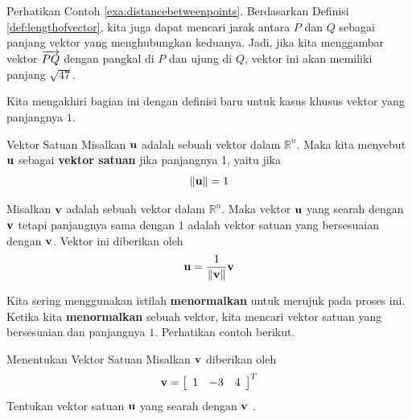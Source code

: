 Perhatikan Contoh \ref{exa:distancebetweenpoints}. Berdasarkan Definisi \ref{def:lengthofvector}, kita juga dapat mencari jarak antara $P$ dan $Q$
sebagai panjang vektor yang menghubungkan keduanya. Jadi, jika kita menggambar vektor $\overrightarrow{PQ}$
dengan pangkal di $P$ dan ujung di $Q$, vektor ini akan memiliki panjang
$\sqrt{47}$.

Kita mengakhiri bagian ini dengan definisi baru untuk kasus khusus
vektor yang panjangnya $1$.

\begin{definition}{Vektor Satuan}\label{def:unitvector}
Misalkan $\mathbf{u}$ adalah sebuah vektor dalam $\mathbb{R}^{n}$. Maka kita menyebut $\mathbf{u}$ sebagai
\textbf{vektor satuan}  jika panjangnya 1, yaitu jika
\begin{equation*}
\| \mathbf{u} \|
=
1
\end{equation*}
\end{definition}

Misalkan $\mathbf{v}$ adalah sebuah vektor dalam $\mathbb{R}^{n}$. Maka vektor $\mathbf{u}$
yang searah dengan $\mathbf{v}$ tetapi panjangnya sama dengan $1$ adalah vektor satuan yang bersesuaian dengan $\mathbf{v}$.
Vektor ini diberikan oleh
\begin{equation*}
\mathbf{u}
=
\frac{1}{\| \mathbf{v} \|}
\mathbf{v}
\end{equation*}

Kita sering menggunakan istilah \textbf{menormalkan} untuk merujuk pada proses ini. Ketika kita \textbf{menormalkan} sebuah vektor, kita mencari vektor satuan yang bersesuaian dan panjangnya $1$.
Perhatikan contoh berikut.

\begin{example}{Menentukan Vektor Satuan}\label{exa:unitvector}
Misalkan $\mathbf{v}$ diberikan oleh
\begin{equation*}
\mathbf{v}
=
\left[
\begin{array}{rrr}
1 & -3 & 4
\end{array}
\right]^T
\end{equation*}
Tentukan vektor satuan $\mathbf{u}$ yang searah dengan $\mathbf{v}$ .
\end{example}

